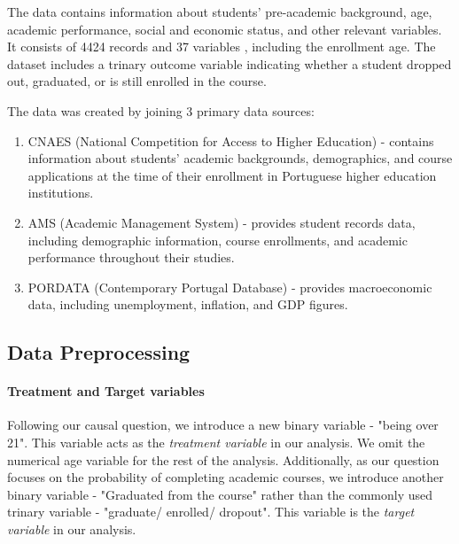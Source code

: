 \documentclass[11pt]{article}
\newcommand{\todo}[1]{{\color{orange}{TODO: #1}}}
\newcommand{\gur}[1]{{\color{teal}{Gur: #1}}}
\begin{document}
The data contains information about students' pre-academic background, age, academic performance, social and economic status, and other relevant variables. It consists of 4424 records and 37 variables \todo{number of categorical and numerical}, including the enrollment age. The dataset includes a trinary outcome variable indicating whether a student dropped out, graduated, or is still enrolled in the course. 

The data was created by joining 3 primary data sources: 
\begin{enumerate}
    \item CNAES (National Competition for Access to Higher Education) - contains information about students' academic backgrounds, demographics, and course applications at the time of their enrollment in Portuguese higher education institutions.
    \item AMS (Academic Management System) - provides student records data, including demographic information, course enrollments, and academic performance throughout their studies.
    \item PORDATA (Contemporary Portugal Database) - provides macroeconomic data, including unemployment, inflation, and GDP figures.
\end{enumerate}

\gur{Division of the data to classes like in table in the paper}


\todo{Figure star of treatment and target distributions, discussion.}

\todo{Age limitation in Portugal. We can mention and cite the fact that Portugal is said to welcome education in all ages. This statement is commonly used regarding older people, but still.}

\subsection{Data Preprocessing}

\paragraph{Treatment and Target variables} Following our causal question, we introduce a new binary variable - "being over 21". This variable acts as the \emph{treatment variable} in our analysis. We omit the numerical age variable for the rest of the analysis. Additionally, as our question focuses on the probability of completing academic courses, we introduce another binary variable - "Graduated from the course" rather than the commonly used trinary variable - "graduate/  enrolled/ dropout". This variable is the \emph{target variable} in our analysis.
\end{document}
